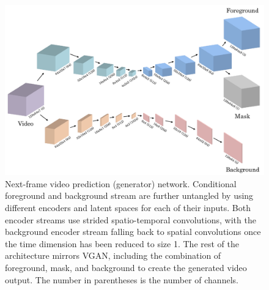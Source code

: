 \begin{figure}
  \centering
  \includegraphics[width=1\textwidth]{graphics/gan/vgan/cvgan_2/cvgan_2.pdf}
  \caption[Next-frame video prediction network.]{Next-frame video prediction (generator) network. Conditional foreground and background stream are further untangled by using different encoders and latent spaces for each of their inputs. Both encoder streams use strided spatio-temporal convolutions, with the background encoder stream falling back to spatial convolutions once the time dimension has been reduced to size 1. The rest of the architecture mirrors VGAN, including the combination of foreground, mask, and background to create the generated video output. The number in parentheses is the number of channels.}
  \label{fig:cvgan_2}
\end{figure}

